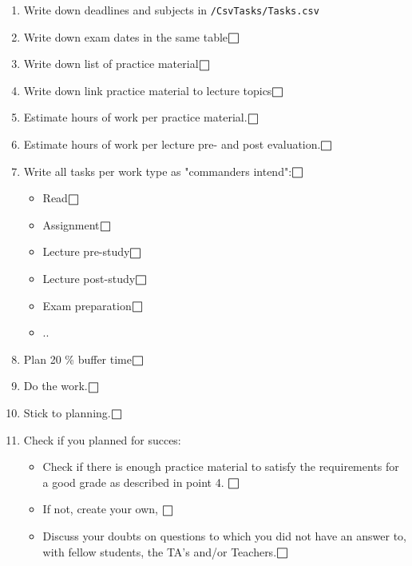 \begin{enumerate}
    \item Write down deadlines and subjects in \verb+/CsvTasks/Tasks.csv+
    \item Write down exam dates in the same table$\msquare$
    \item Write down list of practice material$\msquare$
    \item Write down link practice material to lecture topics$\msquare$
    \item Estimate hours of work per practice material.$\msquare$
    \item Estimate hours of work per lecture pre- and post evaluation.$\msquare$
    \item Write all tasks per work type as "commanders intend"\cite{made_to_stick}:$\msquare$
        \begin{itemize}
            \item Read$\msquare$
            \item Assignment$\msquare$
            \item Lecture pre-study$\msquare$
            \item Lecture post-study$\msquare$
            \item Exam preparation$\msquare$
            \item ..
        \end{itemize}
    \item Plan 20 \% buffer time$\msquare$
    \item Do the work.$\msquare$
    \item Stick to planning.$\msquare$
    \item Check if you planned for succes:
    \begin{itemize}
        \item Check if there is enough practice material to satisfy the requirements for a good grade as described in point 4. $\msquare$ 
        \item If not, create your own, $\msquare$
        \item Discuss your doubts on questions to which you did not have an answer to, with fellow students, the TA's and/or Teachers.$\msquare$%
    \end{itemize}
\end{enumerate}